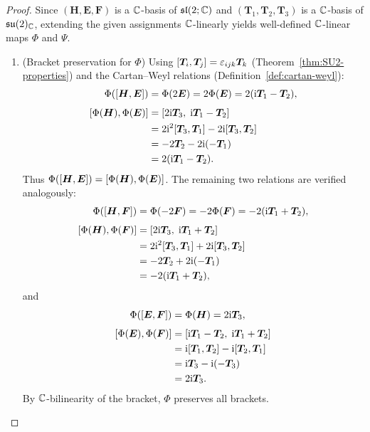 \documentclass[11pt,reqno]{amsart}
\newcommand{\ii}{\mathrm{i}}
\begin{document}
\begin{proof}
Since $(\bm H,\bm E,\bm F)$ is a $\mathbb{C}$-basis of $\mathfrak{sl}(2;\mathbb{C})$
and $(\bm T_1,\bm T_2,\bm T_3)$ is a $\mathbb{C}$-basis of $\mathfrak{su}(2)_{\mathbb{C}}$,
extending the given assignments $\mathbb{C}$-linearly yields well-defined
$\mathbb{C}$-linear maps $\Phi$ and $\Psi$.

\begin{enumerate}
\item (Bracket preservation for $\Phi$)
Using $\SqBr{\bm T_i,\bm T_j}=\eps_{ijk}\bm T_k$
(Theorem~\ref{thm:SU2-properties}) and the Cartan--Weyl relations
(Definition~\ref{def:cartan-weyl}):
\[
\begin{aligned}
\Phi\Br{\SqBr{\bm H,\bm E}}
&=\Phi(2\bm E)
=2\Phi(\bm E)
=2\Br{\ii\bm T_1-\bm T_2}, \\[4pt]
\SqBr{\Phi(\bm H),\Phi(\bm E)}
&=\SqBr{2\ii\bm T_3,\;\ii\bm T_1-\bm T_2} \\
&=2\ii^2\SqBr{\bm T_3,\bm T_1}-2\ii\SqBr{\bm T_3,\bm T_2} \\
&=-2\bm T_2-2\ii(-\bm T_1)\\
&=2\Br{\ii\bm T_1-\bm T_2}.\\
\end{aligned}
\]
Thus $\Phi(\SqBr{\bm H,\bm E})=\SqBr{\Phi(\bm H),\Phi(\bm E)}$.
The remaining two relations are verified analogously:
\[
\begin{aligned}
\Phi\Br{\SqBr{\bm H,\bm F}}
&=\Phi(-2\bm F)=-2\Phi(\bm F)
=-2\Br{\ii\bm T_1+\bm T_2}, \\[4pt]
\SqBr{\Phi(\bm H),\Phi(\bm F)}
&=\SqBr{2\ii\bm T_3,\;\ii\bm T_1+\bm T_2} \\
&=2\ii^2\SqBr{\bm T_3,\bm T_1}+2\ii\SqBr{\bm T_3,\bm T_2} \\
&=-2\bm T_2+2\ii(-\bm T_1)\\
&=-2\Br{\ii\bm T_1+\bm T_2},\\
\end{aligned}
\]
and
\[
\begin{aligned}
\Phi\Br{\SqBr{\bm E,\bm F}}
&=\Phi(\bm H)=2\ii\bm T_3, \\[4pt]
\SqBr{\Phi(\bm E),\Phi(\bm F)}
&=\SqBr{\ii\bm T_1-\bm T_2,\;\ii\bm T_1+\bm T_2} \\
&=\ii\SqBr{\bm T_1,\bm T_2}-\ii\SqBr{\bm T_2,\bm T_1} \\
&=\ii\bm T_3-\ii(-\bm T_3)\\
&=2\ii\bm T_3.\\
\end{aligned}
\]
By $\mathbb{C}$-bilinearity of the bracket, $\Phi$ preserves all brackets.


\end{enumerate}
\end{proof}
\end{document}
